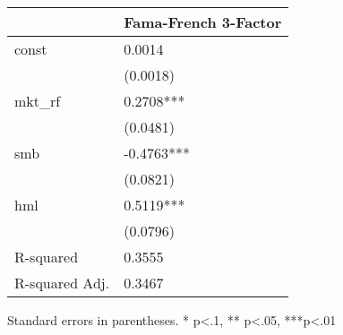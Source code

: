 \begin{table}
\caption{}
\label{}
\begin{center}
\begin{tabular}{ll}
\hline
               & Fama-French 3-Factor  \\
\hline
const          & 0.0014                \\
               & (0.0018)              \\
mkt\_rf        & 0.2708***             \\
               & (0.0481)              \\
smb            & -0.4763***            \\
               & (0.0821)              \\
hml            & 0.5119***             \\
               & (0.0796)              \\
R-squared      & 0.3555                \\
R-squared Adj. & 0.3467                \\
\hline
\end{tabular}
\end{center}
\end{table}
\bigskip
Standard errors in parentheses. \newline 
* p<.1, ** p<.05, ***p<.01